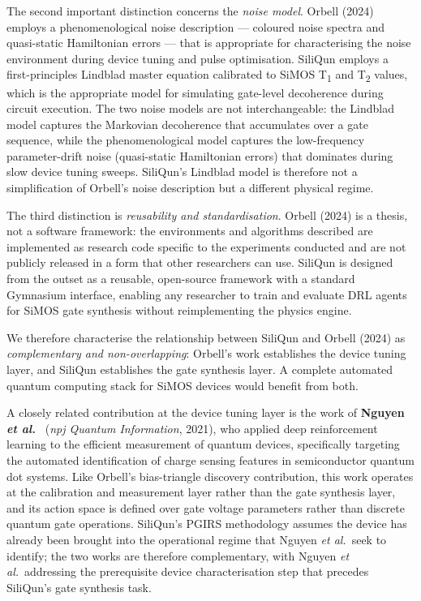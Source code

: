 The second important distinction concerns the \emph{noise model}. Orbell
(2024) employs a phenomenological noise description — coloured noise
spectra and quasi-static Hamiltonian errors — that is appropriate for
characterising the noise environment during device tuning and pulse
optimisation. SiliQun employs a first-principles Lindblad master equation
calibrated to SiMOS T\textsubscript{1} and T\textsubscript{2} values,
which is the appropriate model for simulating gate-level decoherence during
circuit execution. The two noise models are not interchangeable: the Lindblad model captures the Markovian decoherence that accumulates over a gate sequence, while the phenomenological model captures the low-frequency parameter-drift noise (quasi-static Hamiltonian errors) that dominates during slow device tuning sweeps. SiliQun's Lindblad model is therefore not a simplification of
Orbell's noise description but a different physical regime.

The third distinction is \emph{reusability and standardisation}. Orbell
(2024) is a thesis, not a software framework: the environments and
algorithms described are implemented as research code specific to the
experiments conducted and are not publicly released in a form that other
researchers can use. SiliQun is designed from the outset as a reusable,
open-source framework with a standard Gymnasium interface, enabling any
researcher to train and evaluate DRL agents for SiMOS gate synthesis
without reimplementing the physics engine.

We therefore characterise the relationship between SiliQun and Orbell
(2024) as \emph{complementary and non-overlapping}: Orbell's work
establishes the device tuning layer, and SiliQun establishes the gate
synthesis layer. A complete automated quantum computing stack for SiMOS
devices would benefit from both.

A closely related contribution at the device tuning layer is the work of
\textbf{Nguyen \emph{et al.}}~\cite{Nguyen2021} (\textit{npj Quantum Information},
2021), who applied deep reinforcement learning to the efficient measurement
of quantum devices, specifically targeting the automated identification of
charge sensing features in semiconductor quantum dot systems. Like Orbell's
bias-triangle discovery contribution, this work operates at the
calibration and measurement layer rather than the gate synthesis layer, and
its action space is defined over gate voltage parameters rather than discrete
quantum gate operations. SiliQun's PGIRS methodology assumes the device has
already been brought into the operational regime that Nguyen \emph{et al.}\
seek to identify; the two works are therefore complementary, with Nguyen
\emph{et al.}\ addressing the prerequisite device characterisation step that
precedes SiliQun's gate synthesis task.

